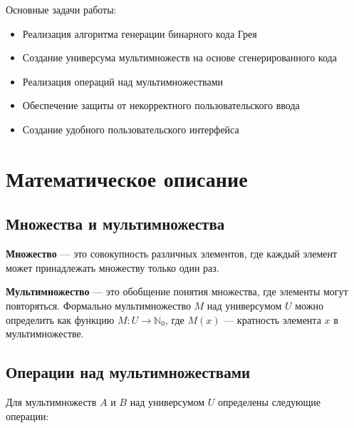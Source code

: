 \documentclass[12pt,a4paper]{article}
\begin{document}
Основные задачи работы:
\begin{itemize}
    \item Реализация алгоритма генерации бинарного кода Грея
    \item Создание универсума мультимножеств на основе сгенерированного кода
    \item Реализация операций над мультимножествами
    \item Обеспечение защиты от некорректного пользовательского ввода
    \item Создание удобного пользовательского интерфейса
\end{itemize}

\newpage

\section{Математическое описание}

\subsection{Множества и мультимножества}

\textbf{Множество} — это совокупность различных элементов, где каждый элемент может принадлежать множеству только один раз.

\textbf{Мультимножество} — это обобщение понятия множества, где элементы могут повторяться. Формально мультимножество $M$ над универсумом $U$ можно определить как функцию $M: U \rightarrow \mathbb{N}_0$, где $M(x)$ — кратность элемента $x$ в мультимножестве.

\subsection{Операции над мультимножествами}

Для мультимножеств $A$ и $B$ над универсумом $U$ определены следующие операции:
\end{document}
